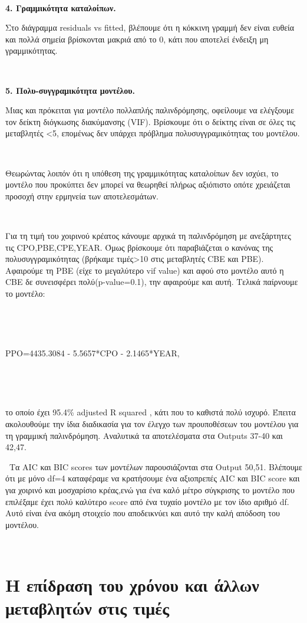 \documentclass[10pt]{article}
\begin{document}
\

\textbf{4. Γραμμικότητα καταλοίπων.}

Στο διάγραμμα residuals vs fitted, βλέπουμε ότι η κόκκινη γραμμή δεν είναι ευθεία και πολλά σημεία βρίσκονται μακριά από το 0, κάτι που αποτελεί ένδειξη μη γραμμικότητας.

\

\textbf{5. Πολυ-συγγραμικότητα μοντέλου.}

Μιας και πρόκειται για μοντέλο πολλαπλής παλινδρόμησης, οφείλουμε να ελέγξουμε τον δείκτη διόγκωσης διακύμανσης (VIF).  Βρίσκουμε ότι ο δείκτης είναι σε όλες τις μεταβλητές <5, επομένως δεν υπάρχει πρόβλημα πολυσυγγραμικότητας του μοντέλου.

\
\

Θεωρώντας λοιπόν ότι η υπόθεση της γραμμικότητας καταλοίπων δεν ισχύει, το μοντέλο που προκύπτει δεν μπορεί να θεωρηθεί πλήρως αξιόπιστο οπότε χρειάζεται προσοχή στην ερμηνεία των αποτελεσμάτων.


\
\

Για τη τιμή του χοιρινού κρέατος κάνουμε αρχικά τη παλινδρόμηση με ανεξάρτητες τις CPO,PBE,CPE,YEAR. Όμως βρίσκουμε ότι παραβιάζεται ο κανόνας της πολυσυγγραμικότητας (βρήκαμε τιμές>10 στις μεταβλητές CBE και PBE). Αφαιρούμε τη PBE (είχε το μεγαλύτερο vif value) και αφού στο μοντέλο αυτό η CBE δε συνεισφέρει πολύ(p-value=0.1), την αφαιρούμε και αυτή. Τελικά παίρνουμε το μοντέλο:

\

\

PPO=4435.3084 - 5.5657*CPO - 2.1465*YEAR,

\

\

το οποίο έχει 95.4\% adjusted R squared , κάτι που το καθιστά πολύ ισχυρό. Έπειτα ακολουθούμε την ίδια διαδικασία για τον έλεγχο των προυποθέσεων του μοντέλου για τη γραμμική παλινδρόμηση. Aναλυτικά τα αποτελέσματα στα Outputs 37-40 και 42,47.

\
Τα AIC και BIC scores των μοντέλων παρουσιάζονται στα Output 50,51. Βλέπουμε ότι με μόνο df=4 καταφέραμε να κρατήσουμε ένα αξιοπρεπές AIC και BIC score και για χοιρινό και μοσχαρίσιο κρέας,ενώ για ένα καλό μέτρο σύγκρισης το μοντέλο που επιλέξαμε έχει πολύ καλύτερο score από ένα τυχαίο μοντέλο με τον ίδιο αριθμό df. Αυτό είναι ένα ακόμη στοιχείο που αποδεικνύει και αυτό την καλή απόδοση του μοντέλου.


\

\section{ Η επίδραση του χρόνου και άλλων μεταβλητών στις τιμές}
\end{document}

